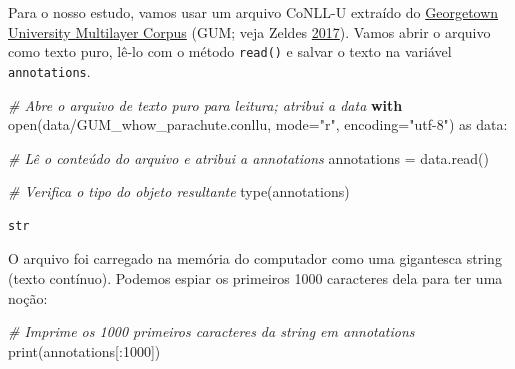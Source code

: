 \documentclass[
  brazilian,
]{article}
\newenvironment{Shaded}{}{}
\newcommand{\BuiltInTok}[1]{#1}
\newcommand{\CommentTok}[1]{\textcolor[rgb]{0.38,0.63,0.69}{\textit{#1}}}
\newcommand{\ControlFlowTok}[1]{\textcolor[rgb]{0.00,0.44,0.13}{\textbf{#1}}}
\newcommand{\DecValTok}[1]{\textcolor[rgb]{0.25,0.63,0.44}{#1}}
\newcommand{\ImportTok}[1]{#1}
\newcommand{\NormalTok}[1]{#1}
\newcommand{\OperatorTok}[1]{\textcolor[rgb]{0.40,0.40,0.40}{#1}}
\newcommand{\StringTok}[1]{\textcolor[rgb]{0.25,0.44,0.63}{#1}}
\begin{document}
Para o nosso estudo, vamos usar um arquivo CoNLL-U extraído do
\href{https://corpling.uis.georgetown.edu/gum/}{Georgetown University
Multilayer Corpus} (GUM; veja Zeldes
\href{http://dx.doi.org/10.1007/s10579-016-9343-x}{2017}). Vamos abrir o
arquivo como texto puro, lê-lo com o método \texttt{read()} e salvar o
texto na variável \texttt{annotations}.

\begin{Shaded}
\begin{Highlighting}[]
\CommentTok{\# Abre o arquivo de texto puro para leitura; atribui a \textquotesingle{}data\textquotesingle{}}
\ControlFlowTok{with} \BuiltInTok{open}\NormalTok{(}\StringTok{\textquotesingle{}data/GUM\_whow\_parachute.conllu\textquotesingle{}}\NormalTok{, mode}\OperatorTok{=}\StringTok{"r"}\NormalTok{, encoding}\OperatorTok{=}\StringTok{"utf{-}8"}\NormalTok{) }\ImportTok{as}\NormalTok{ data:}
    
    \CommentTok{\# Lê o conteúdo do arquivo e atribui a \textquotesingle{}annotations\textquotesingle{}}
\NormalTok{    annotations }\OperatorTok{=}\NormalTok{ data.read()}

\CommentTok{\# Verifica o tipo do objeto resultante}
\BuiltInTok{type}\NormalTok{(annotations)}
\end{Highlighting}
\end{Shaded}

\begin{verbatim}
str
\end{verbatim}

O arquivo foi carregado na memória do computador como uma gigantesca
string (texto contínuo). Podemos espiar os primeiros 1000 caracteres
dela para ter uma noção:

\begin{Shaded}
\begin{Highlighting}[]
\CommentTok{\# Imprime os 1000 primeiros caracteres da string em \textquotesingle{}annotations\textquotesingle{}}
\BuiltInTok{print}\NormalTok{(annotations[:}\DecValTok{1000}\NormalTok{])}
\end{Highlighting}
\end{Shaded}
\end{document}
